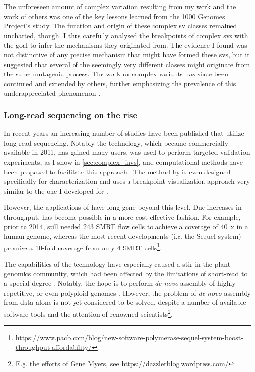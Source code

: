 The unforeseen amount of complex variation resulting from my work and the work
of others was one of the key lessons learned from the 1000 Genomes Project's \sv
study. The function and origin of these complex sv classes remained uncharted,
though. I thus carefully analyzed the breakpoints of complex \acp{sv} with the
goal to infer the mechanisms they originated from. The evidence I found was not
distinctive of any precise mechanism that might have formed these \acp{sv}, but
it suggested that several of the seemingly very different classes might
originate from the same mutagenic process. The work on complex variants has
since been continued and extended by others, further emphasizing the prevalence
of this underappreciated phenomenon \citep{Collins2017}.




\subsubsection{Long-read sequencing on the rise}

In recent years an increasing number of studies have been published that utilize
long-read sequencing. Notably the \pacbio technology, which became commercially
available in 2011, has gained many users. \pacbio was used to perform targeted
validation experiments, as I show in \cref{sec:complex_invs}, and computational
methods have been proposed to facilitate this approach \citep{Wang2015,Rudewicz2016}.
The method by \citet{Wang2015} is even designed specifically for \sv
characterization and uses a breakpoint visualization approach very similar to
the one I developed for \maze.

However, the applications of \pacbio have long gone beyond this level. Due
increases in throughput, \wgs has become possible in a more cost-effective
fashion. For example, prior to 2014, \citet{Chaisson2014} still needed 243 SMRT
flow cells to achieve a coverage of 40~x in a human genome, whereas the most
recent developments (i.e. the \pacbio Sequel system) promise a 10-fold coverage
from only 4 SMRT cells\footnote{\label{footnote:pacbioblog}%
\url{https://www.pacb.com/blog/new-software-polymerase-sequel-system-boost-throughput-affordability/}}.

The capabilities of the \pacbio technology have especially caused a stir in the
plant genomics community, which had been affected by the limitations of
short-read \mps to a special degree \citep{Bickhart2014}. Notably, the hope is
to perform \textit{de novo} assembly of highly repetitive, or even polyploid
genomes \citep{Li2017}. However, the problem of \textit{de novo} assembly from
\pacbio data alone is not yet considered to be solved, despite a number of
available software tools \citep{Chin2013,Chin2016,Koren2017,Koren2018} and the
attention of renowned scientists\footnote{E.g. the efforts of Gene Myers, see
\url{https://dazzlerblog.wordpress.com/}}.

